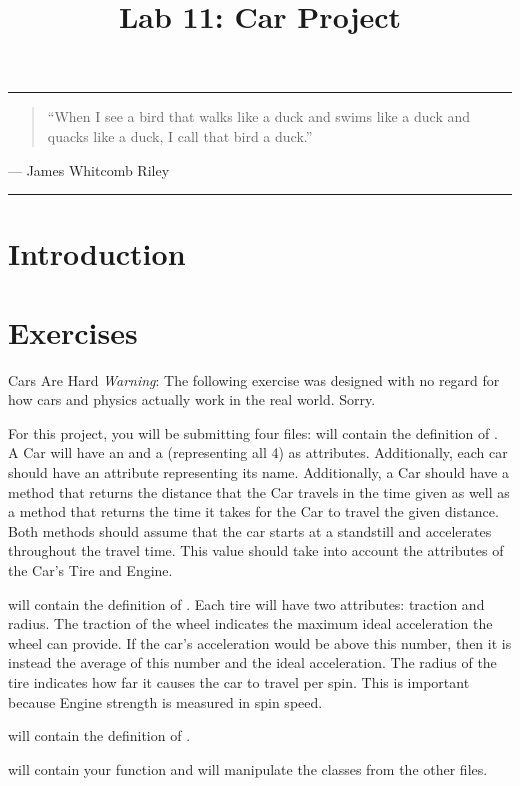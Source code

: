 \documentclass[11pt]{cselabheader}
\title{Lab 11: Car Project}
\begin{document}
\maketitle

\hrule
\begin{quotation}
  ``When I see a bird that walks like a duck and swims like a duck and quacks like
  a duck, I call that bird a duck.''
\end{quotation}
\begin{flushright}
  --- James Whitcomb Riley
\end{flushright}

\hrule

\section{Introduction}


\clearpage
\section{Exercises}
\label{sec:ex}

\begin{warningbox}{Cars Are Hard}
  \emph{Warning}: The following exercise was designed with no regard for how cars and
  physics actually work in the real world. Sorry.
\end{warningbox}

\begin{ex}
  For this project, you will be submitting four files:
   will contain the definition of . A
  Car will have an  and a   (representing all 4)
  as attributes. Additionally, each car should have an attribute representing its name.
  Additionally, a Car should have a method  that returns
  the distance that the Car travels in the time given as well as a method
   that returns the time it takes for the Car to travel
  the given distance. Both methods should assume that
  the car starts at a standstill and accelerates throughout the travel time. This value
  should take into account the attributes of the Car's Tire and Engine.
  
   will contain the definition of . Each tire
  will have two attributes: traction and radius. The traction of the wheel indicates the
  maximum ideal acceleration the wheel can provide. If the car's acceleration would be
  above this number, then it is instead the average of this number and the ideal acceleration.
  The radius of the tire indicates how far it causes the car to travel per spin. This is important
  because Engine strength is measured in spin speed.
  
   will contain the definition of .

   will contain your  function and will
  manipulate the classes from the other files.
\end{ex}
\end{document}
